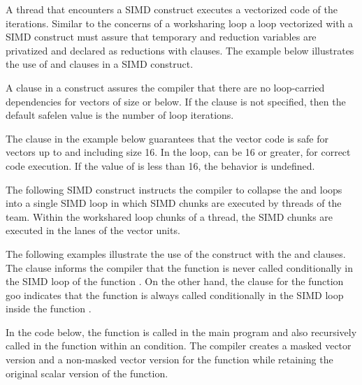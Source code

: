


A thread that encounters a SIMD construct executes a vectorized code of the 
iterations. Similar to the concerns of a worksharing loop a loop vectorized 
with a SIMD construct must assure that temporary and reduction variables are 
privatized and declared as reductions with clauses.  The example below 
illustrates the use of  and  clauses in a SIMD 
construct.




A  clause in a  construct assures the compiler that 
there are no loop-carried dependencies for vectors of size  or below. If 
the  clause is not specified, then the default safelen value is 
the number of loop iterations.
 
The  clause in the example below guarantees that the vector 
code is safe for vectors up to and including size 16.  In the loop,  can 
be 16 or greater, for correct code execution.  If the value of  is less 
than 16, the behavior is undefined.




The following SIMD construct instructs the compiler to collapse the  and 
 loops into a single SIMD loop in which SIMD chunks are executed by 
threads of the team. Within the workshared loop chunks of a thread, the SIMD 
chunks are executed in the lanes of the vector units.




The following examples illustrate the use of the   
construct with the  and  clauses. The 
 clause informs the compiler that the function  is 
never called conditionally in the SIMD loop of the function . On 
the other hand, the  clause for the function goo indicates that 
the function is always called conditionally in the SIMD loop inside 
the function .




In the code below, the function  is called in the main program and 
also recursively called in the function  within an  
condition. The compiler creates a masked vector version and a non-masked vector 
version for the function  while retaining the original scalar 
version of the  function.



